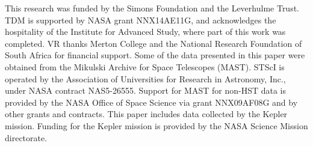 \documentclass[useAMS, usenatbib, preprint, 12pt]{aastex}
\begin{document}
This research was funded by the Simons Foundation and the Leverhulme Trust.
TDM is supported by NASA grant NNX14AE11G, and acknowledges the
hospitality of the Institute for Advanced Study,
where part of this work was completed.
VR thanks Merton College and the National Research Foundation of South Africa
for financial support.
Some of the data presented in this paper were obtained from the Mikulski
Archive for Space Telescopes (MAST).
STScI is operated by the Association of Universities for Research in
Astronomy, Inc., under NASA contract NAS5-26555.
Support for MAST for non-HST data is provided by the NASA Office of Space
Science via grant NNX09AF08G and by other grants and contracts.
This paper includes data collected by the Kepler mission. Funding for the
Kepler mission is provided by the NASA Science Mission directorate.





\end{document}
